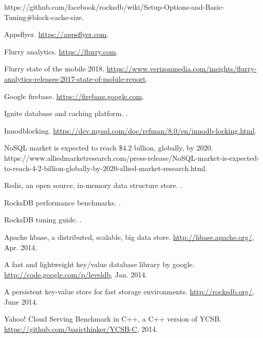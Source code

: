 \documentclass[sigplan,10pt]{acmart}
\begin{document}
\clearpage
\begin{thebibliography}{10}

https://github.com/facebook/rocksdb/wiki/Setup-Options-and-Basic-Tuning\#block-cache-size.

Appsflyer.
\newblock \url{https://appsflyer.com}.

Flurry analytics.
\newblock \url{https://flurry.com}.

Flurry state of the mobile 2018.
\newblock
  \url{https://www.verizonmedia.com/insights/flurry-analytics-releases-2017-state-of-mobile-report}.

Google firebase.
\newblock \url{https://firebase.google.com}.

{Ignite } database and caching platform.
.

Innodblocking.
\newblock \url{https://dev.mysql.com/doc/refman/8.0/en/innodb-locking.html}.

{NoSQL} market is expected to reach \$4.2 billion, globally, by 2020.
\newblock
  {https://www.alliedmarketresearch.com/press-release/NoSQL-market-is-expected-to-reach-4-2-billion-globally-by-2020-allied-market-research.html}.

Redis, an open source, in-memory data structure store.
.

{RocksDB} performance benchmarks.
.

{RocksDB} tuning guide.
.

Apache hbase, a distributed, scalable, big data store.
\newblock \url{http://hbase.apache.org/}, Apr. 2014.

A fast and lightweight key/value database library by google.
\newblock \url{http://code.google.com/p/leveldb}, Jan. 2014.

A persistent key-value store for fast storage environments.
\newblock \url{http://rocksdb.org/}, June 2014.

{Yahoo! Cloud Serving Benchmark in C++, a C++ version of YCSB}.
\newblock \url{https://github.com/basicthinker/YCSB-C}, 2014.


\end{thebibliography}
\end{document}
